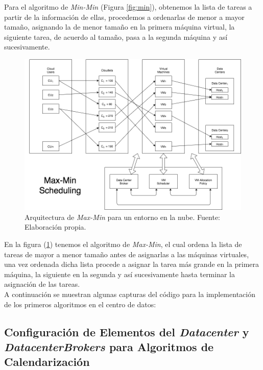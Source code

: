Para el algoritmo de \textit{Min-Min} (Figura \ref{fig:min}), obtenemos la lista de tareas a partir de la informaci\'on de ellas, procedemos a ordenarlas de menor a mayor tama\~no, asignando la de menor tama\~no en la primera m\'aquina virtual, la siguiente tarea, de acuerdo al tama\~no, pasa a la segunda m\'aquina y as\'i sucesivamente.

\newpage
\setcounter{figure}{6}
\renewcommand\thefigure{\arabic{figure}}
\begin{figure}[h!]
	\centering
	\includegraphics[scale=0.5]{media/imagencuatro}
	\caption{Arquitectura de \textit{Max-Min} para un entorno en la nube. Fuente: Elaboraci\'on propia.}
	\label{fig:max}
\end{figure}

En la figura (\ref{fig:max}) tenemos el algoritmo de \textit{Max-Min}, el cual ordena la lista de tareas de mayor a menor tama\~no antes de asignarlas a las m\'aquinas virtuales, una vez ordenada dicha lista procede a asignar la tarea m\'as grande en la primera m\'aquina, la siguiente en la segunda y as\'i sucesivamente hasta terminar la asignaci\'on de las tareas.\\



A continuaci\'on se muestran algunas capturas del c\'odigo para la implementaci\'on de los primeros algoritmos en el centro de datos:

\newpage

\subsection*{Configuración de Elementos del \textit{Datacenter} y \textit{DatacenterBrokers} para Algoritmos de Calendarización}


